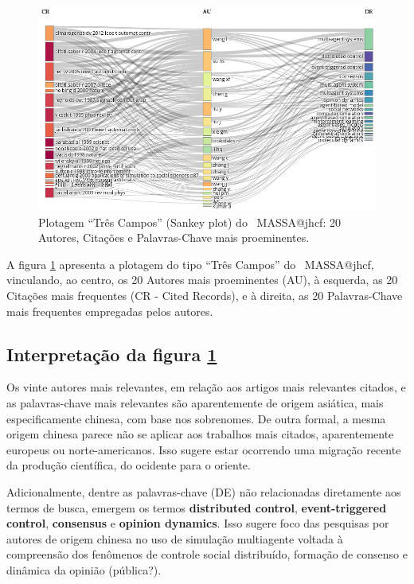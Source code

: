 \begin{figure}
    \centering
    \includegraphics[angle=0,width=1\textwidth]{experiments/jhcf/PesqBibliogr/SimulacaoMultiagente/WoS-20210803/classico-mais-citacoes/Dataset/ThreeFieldPlot-AU-CR-DE-20-20-20.png}
    \caption{Plotagem ``Três Campos'' (Sankey plot) do \dataset\   MASSA@jhcf: 20 Autores, Citações e Palavras-Chave mais proeminentes.}
    \label{fig:MASSA@jhcf:ThreeFieldPlot}
\end{figure}

A figura \ref{fig:MASSA@jhcf:ThreeFieldPlot} apresenta a plotagem do tipo ``Três Campos'' do \dataset\   MASSA@jhcf, vinculando, ao centro, os 20 Autores mais proeminentes (AU), à esquerda, as 20 Citações mais frequentes (CR - Cited Records), e à direita, as 20 Palavras-Chave mais frequentes empregadas pelos autores.

\subsection{Interpretação da figura \ref{fig:MASSA@jhcf:ThreeFieldPlot}}
Os vinte autores mais relevantes, em relação aos artigos mais relevantes citados, e as palavras-chave mais relevantes são aparentemente de origem asiática, mais especificamente chinesa, com base nos sobrenomes. De outra formal, a mesma origem chinesa parece não se aplicar aos trabalhos mais citados, aparentemente europeus ou norte-americanos. Isso sugere estar ocorrendo uma migração recente da produção científica, do ocidente para o oriente. 

Adicionalmente, dentre as palavras-chave (DE) não relacionadas diretamente aos termos de busca, emergem os termos \textbf{distributed control}, \textbf{event-triggered control}, \textbf{consensus} e \textbf{opinion dynamics}. Isso sugere foco das pesquisas por autores de origem chinesa no uso de simulação multiagente voltada à compreensão dos fenômenos de controle social distribuído, formação de consenso e dinâmica da opinião (pública?).

